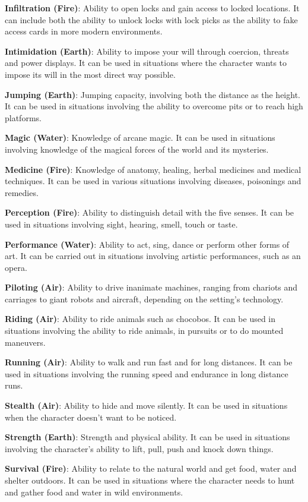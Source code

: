 \begin{multicols}{2}
\textbf{Infiltration (Fire)}: Ability to open locks
and gain access to locked locations. It can include
both the ability to unlock locks with lock picks as
the ability to fake access cards in more modern
environments.

\textbf{Intimidation (Earth)}: Ability to impose
your will through coercion, threats and power
displays. It can be used in situations where the
character wants to impose its will in the most
direct way possible.

\textbf{Jumping (Earth)}: Jumping capacity,
involving both the distance as the height. It can be
used in situations involving the ability to
overcome pits or to reach high platforms.

\textbf{Magic (Water)}: Knowledge of arcane
magic. It can be used in situations involving
knowledge of the magical forces of the world and
its mysteries.

\textbf{Medicine (Fire)}: Knowledge of anatomy,
healing, herbal medicines and medical techniques.
It can be used in various situations involving
diseases, poisonings and remedies.

\textbf{Perception (Fire)}:
Ability to distinguish detail
with the five senses. It can be
used in situations involving
sight, hearing, smell, touch or
taste.

\textbf{Performance (Water)}:
Ability to act, sing,
dance or perform other
forms of art. It can be carried
out in situations involving
artistic performances, such
as an opera.

\textbf{Piloting (Air)}: Ability to drive inanimate
machines, ranging from chariots and carriages to
giant robots and aircraft, depending on the
setting’s technology.

\textbf{Riding (Air)}: Ability to ride animals such
as chocobos. It can be used in situations involving
the ability to ride animals, in pursuits or to do
mounted maneuvers.

\textbf{Running (Air)}: Ability to walk and run fast
and for long distances. It can be used in situations
involving the running speed and endurance in long
distance runs.

\textbf{Stealth (Air)}: Ability to hide and move
silently. It can be used in situations when the
character doesn’t want to be noticed.

\textbf{Strength (Earth)}: Strength and physical
ability. It can be used in situations involving the
character's ability to lift, pull, push and knock
down things.

\textbf{Survival (Fire)}: Ability to relate to the
natural world and get food, water and shelter
outdoors. It can be used in situations where the
character needs to hunt and gather food and water
in wild environments.


\end{multicols}
